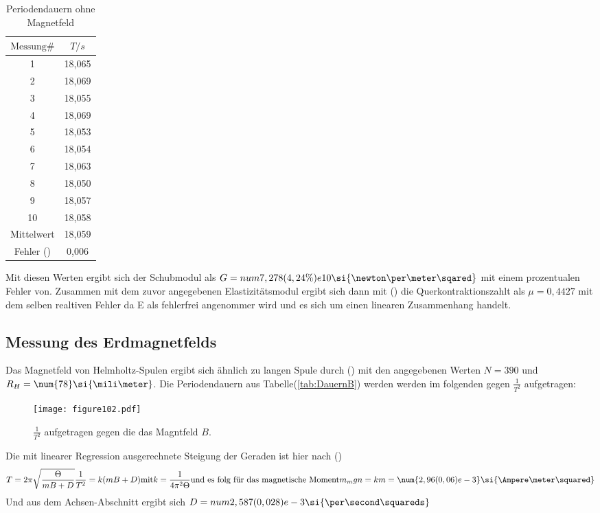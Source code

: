 \begin{table}
\centering
\caption{Periodendauern ohne Magnetfeld}
\label{tab:Dauern}
\begin{tabular}{ c S[table-format=2.3] }
\toprule
$\text{Messung#}$ & $T/s$ \\
 & 18,065  \\
2 & 18,069  \\
3 & 18,055  \\
4 & 18,069  \\
5 & 18,053  \\
6 & 18,054  \\
7 & 18,063  \\
8 & 18,050  \\
9 & 18,057  \\
10 & 18,058 \\
\midrule
Mittelwert& 18,059 \\
Fehler () & 0,006\\
\bottomrule
\end{tabular}
\end{table}

Mit diesen Werten ergibt sich der Schubmodul als $G = num{7,278(4,24\%)e10}\si{\newton\per\meter\sqared}$
mit einem prozentualen Fehler von. Zusammen mit dem zuvor angegebenen Elastizitätsmodul
ergibt sich dann mit () die Querkontraktionszahlt als $\mu = 0,4427$
mit dem selben realtiven Fehler da E als fehlerfrei angenommer wird und es sich um einen linearen Zusammenhang handelt.

\subsection{Messung des Erdmagnetfelds}

Das Magnetfeld von Helmholtz-Spulen ergibt sich ähnlich zu langen Spule durch ()
mit den angegebenen Werten $N = \num{390}$ und $R_H = \num{78}\si{\mili\meter}$.
Die Periodendauern aus Tabelle(\ref{tab:DauernB}) werden werden im folgenden gegen $\frac{1}{T^2}$ aufgetragen:
\begin{figure}
  \centering
  \texttt{[image: figure102.pdf]}
  \caption{$\frac{1}{T^2}$ aufgetragen gegen die das Magntfeld $B$.}
  \label{fig:1}
\end{figure}
Die mit linearer Regression ausgerechnete Steigung der Geraden ist hier nach ()
\begin{equation*}
  T = 2\pi\sqrt{\frac{\Theta}{mB+D}}
  \frac{1}{T^2} =k(mB+D) \text{mit} k=\frac{1}{4\pi^2\Theta}
\text{und es folg für das magnetische Moment}
 m_mgn = km = \num{2,96(0,06)e-3}   \si{\Ampere\meter\squared}
\end{equation*}
Und aus dem Achsen-Abschnitt ergibt sich $D = num{2,587(0,028)e-3}\si{\per\second\squareds}$

